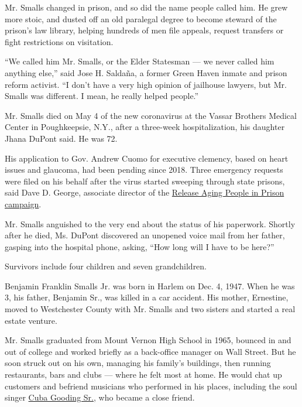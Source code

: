 Mr. Smalls changed in prison, and so did the name people called him. He
grew more stoic, and dusted off an old paralegal degree to become
steward of the prison's law library, helping hundreds of men file
appeals, request transfers or fight restrictions on visitation.

``We called him Mr. Smalls, or the Elder Statesman --- we never called
him anything else,'' said Jose H. Saldaña, a former Green Haven inmate
and prison reform activist. ``I don't have a very high opinion of
jailhouse lawyers, but Mr. Smalls was different. I mean, he really
helped people.''

Mr. Smalls died on May 4 of the new coronavirus at the Vassar Brothers
Medical Center in Poughkeepsie, N.Y., after a three-week
hospitalization, his daughter Jhana DuPont said. He was 72.

His application to Gov. Andrew Cuomo for executive clemency, based on
heart issues and glaucoma, had been pending since 2018. Three emergency
requests were filed on his behalf after the virus started sweeping
through state prisons, said Dave D. George, associate director of the
\href{https://auburnpub.com/news/local/govt-and-politics/more-covid-19-cases-in-ny-prisons-groups-urge-cuomo-to-release-high-risk-inmates/article_c616d0b8-71cd-56f3-b108-402c1abd282e.html}{Release
Aging People in Prison campaign}.

Mr. Smalls anguished to the very end about the status of his paperwork.
Shortly after he died, Ms. DuPont discovered an unopened voice mail from
her father, gasping into the hospital phone, asking, ``How long will I
have to be here?''

Survivors include four children and seven grandchildren.

Benjamin Franklin Smalls Jr. was born in Harlem on Dec. 4, 1947. When he
was 3, his father, Benjamin Sr., was killed in a car accident. His
mother, Ernestine, moved to Westchester County with Mr. Smalls and two
sisters and started a real estate venture.

Mr. Smalls graduated from Mount Vernon High School in 1965, bounced in
and out of college and worked briefly as a back-office manager on Wall
Street. But he soon struck out on his own, managing his family's
buildings, then running restaurants, bars and clubs --- where he felt
most at home. He would chat up customers and befriend musicians who
performed in his places, including the soul singer
\href{https://www.nytimes.com/2017/04/21/arts/music/cuba-gooding-sr-dead-soul-singer.html}{Cuba
Gooding Sr.}, who became a close friend.

